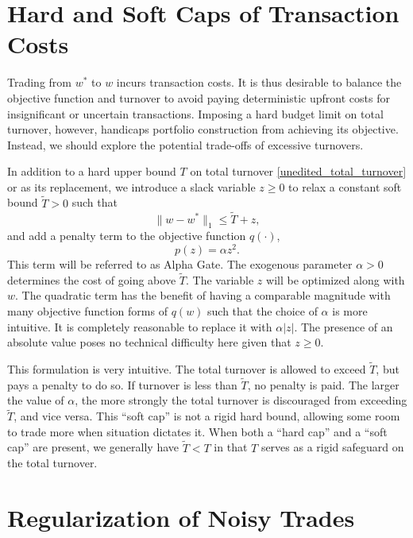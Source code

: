 \documentclass[11pt, letterpaper]{article}
\begin{document}
\section{Hard and Soft Caps of Transaction Costs}
\label{sec:alpha_gate}

Trading from $w^*$ to $w$ incurs transaction costs. It is thus desirable to balance the objective function and turnover to
avoid paying deterministic upfront costs for insignificant or uncertain transactions. Imposing a hard budget limit on total
turnover, however, handicaps portfolio construction from achieving its objective. Instead, we should explore the potential
trade-offs of excessive turnovers.

In addition to a hard upper bound $T$ on total turnover \eqref{unedited_total_turnover} or as its replacement, we introduce a
slack variable $z \geq 0$ to relax a constant soft bound $\tilde{T} > 0$ such that
\begin{equation*}
	\lVert w - w^*\rVert_1 \leq \tilde{T} + z,
\end{equation*}
and add a penalty term to the objective function $q(\cdot)$,
\begin{equation}\label{eq:tvr-total}
	p(z) = \alpha z^2.
\end{equation}
This term will be referred to as Alpha Gate. The exogenous parameter $\alpha > 0$ determines the cost of going above
$\tilde{T}$. The variable $z$ will be optimized along with $w$. The quadratic term has the benefit of having a comparable
magnitude with many objective function forms of $q(w)$ such that the choice of $\alpha$ is more intuitive. It is completely
reasonable to replace it with $\alpha |z|$. The presence of an absolute value poses no technical difficulty here given that
$z \geq 0$.

This formulation is very intuitive. The total turnover is allowed to exceed $\tilde{T}$, but pays a penalty to do so. If
turnover is less than $\tilde{T}$, no penalty is paid. The larger the value of $\alpha$, the more strongly the total turnover is
discouraged from exceeding $\tilde{T}$, and vice versa. This ``soft cap'' is not a rigid hard bound, allowing some room to trade more
when situation dictates it. When both a ``hard cap'' and a ``soft cap'' are present, we generally have $\tilde{T} < T$ in that
$T$ serves as a rigid safeguard on the total turnover.

\section{Regularization of Noisy Trades}
\label{sec:regularization}
\end{document}

